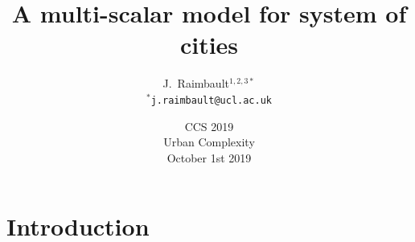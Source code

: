 



\title[Multiscale urban growth]{A multi-scalar model for system of cities}
\author[Raimbault]{J.~Raimbault$^{1,2,3\ast}$\\\medskip
$^{\ast}$\texttt{j.raimbault@ucl.ac.uk}
}



\date[1st October 2019]{CCS 2019\\
Urban Complexity\\
October 1st 2019
}

\frame{\maketitle}





\section{Introduction}





